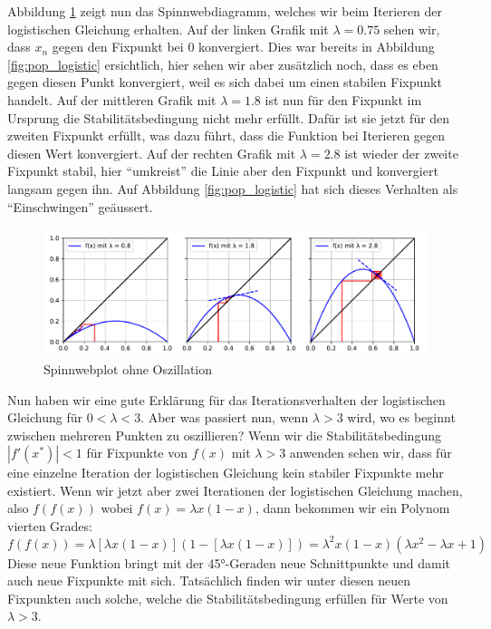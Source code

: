 Abbildung \ref{fig:web_1} zeigt nun das Spinnwebdiagramm,
welches wir beim Iterieren der logistischen Gleichung erhalten.  
Auf der linken Grafik mit $\lambda = 0.75$ sehen wir,
dass $x_n$ gegen den Fixpunkt bei $0$ konvergiert. 
Dies war bereits in Abbildung \ref{fig:pop_logistic} ersichtlich,
hier sehen wir aber zusätzlich noch, dass es eben gegen
diesen Punkt konvergiert, weil es sich dabei um einen
stabilen Fixpunkt handelt.  
Auf der mittleren Grafik mit $\lambda = 1.8$ ist nun für den
Fixpunkt im Ursprung die Stabilitätsbedingung nicht
mehr erfüllt. 
Dafür ist sie jetzt für den zweiten Fixpunkt erfüllt, 
was dazu führt, dass die Funktion bei Iterieren gegen 
diesen Wert konvergiert.  
Auf der rechten Grafik mit $\lambda = 2.8$ ist wieder der  
zweite Fixpunkt stabil, hier ``umkreist'' die Linie aber
den Fixpunkt und konvergiert langsam gegen ihn. 
Auf Abbildung \ref{fig:pop_logistic} hat sich dieses Verhalten
als ``Einschwingen'' geäussert.
\begin{figure}
    \includegraphics[width=\linewidth]{papers/logistic/figures/web_1.pdf}
    \caption{Spinnwebplot ohne Oszillation}
    \label{fig:web_1}
\end{figure}

Nun haben wir eine gute Erklärung für das Iterationsverhalten
der logistischen Gleichung für $0 < \lambda < 3$. 
Aber was passiert nun, wenn $\lambda > 3$ wird,
wo es beginnt zwischen mehreren Punkten zu oszillieren?
Wenn wir die Stabilitätsbedingung $|f'(x^*)| < 1$
für Fixpunkte von $f(x)$ mit $\lambda > 3$ anwenden sehen wir,
dass für eine einzelne Iteration der logistischen 
Gleichung kein stabiler Fixpunkte mehr existiert. 
Wenn wir jetzt aber zwei Iterationen der logistischen
Gleichung machen, also 
$f(f(x))$ wobei $f(x)=\lambda x (1-x)$,
dann bekommen wir ein Polynom vierten Grades:
\begin{equation}
    f(f(x))
    =
    \lambda [\lambda x (1-x)] (1-[\lambda x (1-x)])
    =
    \lambda^2 x (1-x) (\lambda x^2 - \lambda x + 1)
\end{equation}
Diese neue Funktion bringt mit der 45°-Geraden 
neue Schnittpunkte und damit auch neue Fixpunkte mit sich.
Tatsächlich finden wir unter diesen neuen Fixpunkten 
auch solche, welche die Stabilitätsbedingung erfüllen für
Werte von $\lambda > 3$.

